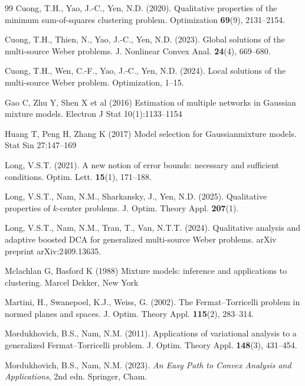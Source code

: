 \documentclass[11pt]{article}
\theoremstyle{definition}
\newcommand{\1}{\mathbf{1}}
\begin{document}
\begin{thebibliography}{99}
Cuong, T.H., Yao, J.-C., Yen, N.D. (2020). Qualitative properties of the minimum sum-of-squares clustering problem. Optimization \textbf{69}(9), 2131--2154.

Cuong, T.H., Thien, N., Yao, J.-C., Yen, N.D. (2023). Global solutions of the multi-source Weber problems. J. Nonlinear Convex Anal. \textbf{24}(4), 669--680.

Cuong, T.H., Wen, C.-F., Yao, J.-C., Yen, N.D. (2024). Local solutions of the multi-source Weber problem. Optimization, 1--15.

Gao C, Zhu Y, Shen X et al (2016) Estimation of multiple networks in
Gaussian mixture models. Electron J Stat 10(1):1133--1154

Huang T, Peng H, Zhang K (2017) Model selection for Gaussianmixture
models. Stat Sin 27:147--169

Long, V.S.T. (2021). A new notion of error bounds: necessary and sufficient conditions. Optim. Lett. \textbf{15}(1), 171--188.

Long, V.S.T., Nam, N.M., Sharkansky, J., Yen, N.D. (2025). Qualitative properties of $k$-center problems. J. Optim. Theory Appl. \textbf{207}(1).

Long, V.S.T., Nam, N.M., Tran, T., Van, N.T.T. (2024). Qualitative analysis and adaptive boosted DCA for generalized multi-source Weber problems. arXiv preprint arXiv:2409.13635.

Mclachlan G, Basford K (1988) Mixture models: inference and applications to clustering. Marcel Dekker, New York

Martini, H., Swanepoel, K.J., Weiss, G. (2002). The Fermat--Torricelli problem in normed planes and spaces. J. Optim. Theory Appl. \textbf{115}(2), 283--314.



Mordukhovich, B.S., Nam, N.M. (2011). Applications of variational analysis to a generalized Fermat--Torricelli problem. J. Optim. Theory Appl. \textbf{148}(3), 431--454.

Mordukhovich, B.S., Nam, N.M. (2023). \emph{An Easy Path to Convex Analysis and Applications}, 2nd edn. Springer, Cham.


\end{thebibliography}
\end{document}

